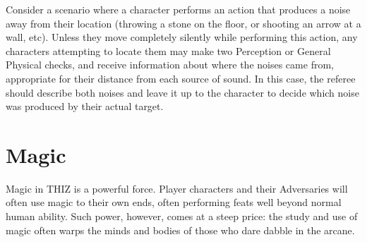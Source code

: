 \documentclass[oneside]{book}
\begin{document}
\begin{multicols}{2}
Consider a scenario where a character performs an action that produces a noise away from their location (throwing a stone on the floor, or shooting an arrow at a wall, etc). Unless they move completely silently while performing this action, any characters attempting to locate them may make two Perception or General Physical checks, and receive information about where the noises came from, appropriate for their distance from each source of sound. In this case, the referee should describe both noises and leave it up to the character to decide which noise was produced by their actual target. 

\end{multicols}

\chapter{Magic}
Magic in THIZ is a powerful force. Player characters and their Adversaries will often use magic to their own ends, often performing feats well beyond normal human ability. Such power, however, comes at a steep price: the study and use of magic often warps the minds and bodies of those who dare dabble in the arcane.
\end{document}
